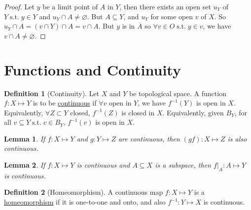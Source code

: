 \documentclass[12pt]{amsart}
\newcommand{\suchthat}{\operatorname{s.t.}}
\theoremstyle{plain}
\newtheorem*{lem}{Lemma}
\theoremstyle{remark}
\theoremstyle{definition}
\newtheorem*{define}{Definition}
\begin{document}
\begin{proof}
	Let $y$ be a limit point of $A$ in $Y$, then there exists an open set $u_Y$ of $Y \suchthat y \in Y$ and $u_Y \cap A \neq \varnothing$. But $A \subseteq Y$, and $u_Y$ for some open $v$ of $X$. So $u_Y \cap A = (v\cap Y)\cap A = v \cap A$. But $y$ is in $\overline{A}$ so $\forall v \in O \suchthat y \in v$, we have $v \cap A \neq \varnothing$.   
\end{proof}

\section*{Functions and Continuity}
\begin{define}[Continuity]
	Let $X$ and $Y$ be topological space. A function $f: X \mapsto Y$ is to be \ul{continuous} if $\forall v$ open in $Y$, we have $f^{-1}(Y)$ is open in $X$.
	\newline
	Equivalently, $\forall Z \subset Y$ closed, $f^{-1}(Z)$ is closed in $X$.
	Equivalently, given $B_Y$, for all $v \subseteq Y \suchthat v \in B_Y$, $f^{-1}(v)$ is open in $X$. 
\end{define}

\begin{lem}
	If $f:X \mapsto Y$ and $g: Y \mapsto Z$ are continuous, then $(gf):X \mapsto Z$ is also continuous.
\end{lem}

\begin{lem}
	If $f:X \mapsto Y$ is continuous and $A \subseteq X$ is a subspace, then $f|_A: A \mapsto Y$ is continuous.
\end{lem}
\begin{define}[Homeomorphism]
	A continuous map $f:X \mapsto Y$ is a \ul{homeomorphism} if it is one-to-one and onto, and also $f^{-1}:Y \mapsto X$ is continuous.
\end{define}
\end{document}
